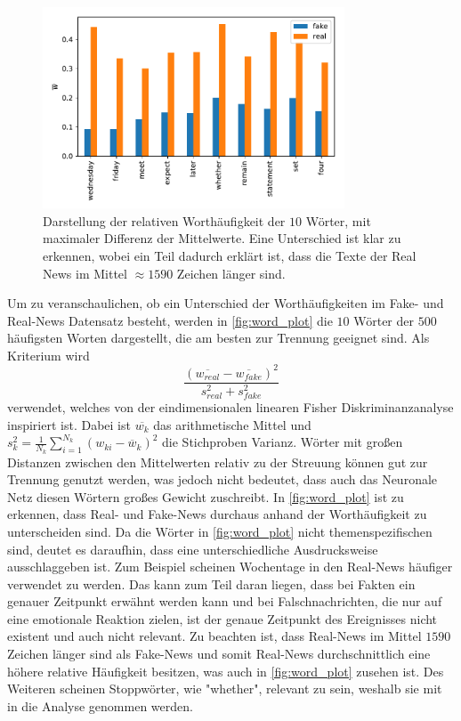 \begin{figure}
    \centering
    \includegraphics[width=0.8\textwidth]{pictures/data_visualisation.pdf}
    \caption{Darstellung der relativen Worthäufigkeit der $10$ Wörter, mit maximaler Differenz der Mittelwerte.
            Eine Unterschied ist klar zu erkennen, wobei ein Teil dadurch erklärt ist, dass die Texte der Real 
            News im Mittel $\approx 1590$ Zeichen länger sind.}
    \label{fig:word_plot}
\end{figure}

Um zu veranschaulichen, ob ein Unterschied der Worthäufigkeiten im Fake- und Real-News Datensatz besteht, werden in \autoref{fig:word_plot}
die $10$ Wörter der $500$ häufigsten Worten dargestellt, die am besten zur Trennung geeignet sind. 
Als Kriterium wird 
\begin{equation}
    \frac{(\overline{w_{real}}-\overline{w_{fake}})^2}{s_{real}^2+s_{fake}^2}
\end{equation}
verwendet, welches von der eindimensionalen linearen Fisher Diskriminanzanalyse inspiriert ist. 
Dabei ist $\overline{w_k}$ das arithmetische Mittel und $s_{k}^{2}=\frac{1}{N_k}\sum_{i=1}^{N_{k}}\left(w_{k i}-\overline{w}_{k}\right)^{2}$ 
die Stichproben Varianz.
Wörter mit großen Distanzen zwischen den Mittelwerten relativ zu der Streuung können gut zur Trennung genutzt werden, was 
jedoch nicht bedeutet, dass auch das Neuronale Netz diesen Wörtern großes Gewicht zuschreibt.
In \autoref{fig:word_plot} ist zu erkennen, dass Real- und Fake-News durchaus anhand der Worthäufigkeit zu unterscheiden sind. 
Da die Wörter in \autoref{fig:word_plot} nicht themenspezifischen sind, deutet es daraufhin, dass eine unterschiedliche 
Ausdrucksweise ausschlaggeben ist. 
Zum Beispiel scheinen Wochentage in den Real-News häufiger verwendet zu werden. 
Das kann zum Teil daran liegen, dass bei Fakten ein genauer Zeitpunkt erwähnt werden kann und bei Falschnachrichten, die 
nur auf eine emotionale Reaktion zielen, ist der genaue Zeitpunkt des Ereignisses nicht existent und auch nicht relevant.
Zu beachten ist, dass Real-News im Mittel $\num{1590}$ Zeichen länger sind als Fake-News und somit Real-News durchschnittlich
eine höhere relative Häufigkeit besitzen, was auch in \autoref{fig:word_plot} zusehen ist.
Des Weiteren scheinen Stoppwörter, wie "whether", relevant zu sein, weshalb sie mit in die Analyse genommen werden.

